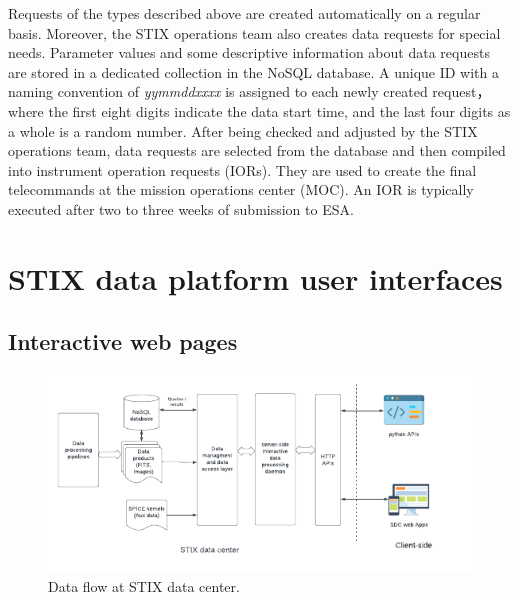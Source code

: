 \documentclass[referee]{aa} %
\begin{document}
Requests of the types described above are created automatically on a regular basis.
Moreover, the STIX operations team also creates data requests for special needs. 
Parameter values and some descriptive information about data requests are stored in a dedicated collection in the NoSQL database.  A unique ID with a naming convention of {\it yymmddxxxx} is assigned to each newly created request， where 
the first eight digits indicate the data start time, 
and the last four digits as a whole is a random number.  
After being checked and adjusted by the STIX operations team, data requests 
 are selected from the database and then compiled into instrument operation requests (IORs). 
They are used to create the final telecommands at the mission operations center (MOC). 
An IOR is typically executed after two to three weeks of submission to ESA. 

\section{STIX data platform user interfaces}
\subsection{Interactive web pages}
\begin{figure}[h]
  \centering
  \includegraphics[width=0.9\linewidth]{figures/interfaces.pdf}
  \caption{ 
    Data flow at STIX data center.
  }
  \label{fig:interfaces}
\end{figure}
\end{document}

